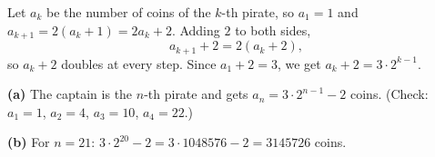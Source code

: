 Let $a_k$ be the number of coins of the $k$-th pirate, so $a_1=1$ and $a_{k+1}=2(a_k+1)=2a_k+2$. Adding $2$ to both sides,
\[a_{k+1}+2=2\left(a_k+2\right),\]
so $a_k+2$ doubles at every step. Since $a_1+2=3$, we get $a_k+2=3\cdot2^{k-1}$.

\textbf{(a)} The captain is the $n$-th pirate and gets $\boxed{a_n=3\cdot2^{n-1}-2}$ coins. (Check: $a_1=1$, $a_2=4$, $a_3=10$, $a_4=22$.)

\textbf{(b)} For $n=21$: $3\cdot2^{20}-2=3\cdot1048576-2=\boxed{3145726}$ coins.
